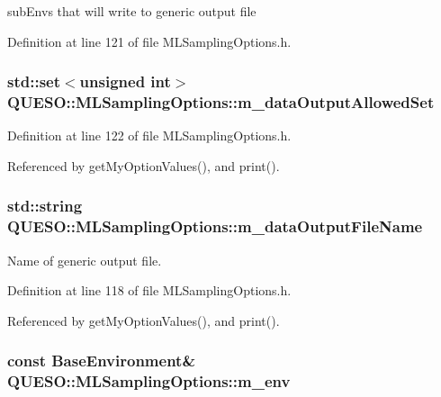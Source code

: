 sub\-Envs that will write to generic output file 



Definition at line 121 of file M\-L\-Sampling\-Options.\-h.

\hypertarget{class_q_u_e_s_o_1_1_m_l_sampling_options_aa5f7e589376e3700b0132c1fa91cccc9}{
\subsubsection[{m\-\_\-data\-Output\-Allowed\-Set}]{\setlength{\rightskip}{0pt plus 5cm}std\-::set$<$unsigned int$>$ Q\-U\-E\-S\-O\-::\-M\-L\-Sampling\-Options\-::m\-\_\-data\-Output\-Allowed\-Set}}\label{class_q_u_e_s_o_1_1_m_l_sampling_options_aa5f7e589376e3700b0132c1fa91cccc9}


Definition at line 122 of file M\-L\-Sampling\-Options.\-h.



Referenced by get\-My\-Option\-Values(), and print().

\hypertarget{class_q_u_e_s_o_1_1_m_l_sampling_options_a2507c0e8b86f9d6f07a3f5609593fc96}{
\subsubsection[{m\-\_\-data\-Output\-File\-Name}]{\setlength{\rightskip}{0pt plus 5cm}std\-::string Q\-U\-E\-S\-O\-::\-M\-L\-Sampling\-Options\-::m\-\_\-data\-Output\-File\-Name}}\label{class_q_u_e_s_o_1_1_m_l_sampling_options_a2507c0e8b86f9d6f07a3f5609593fc96}


Name of generic output file. 



Definition at line 118 of file M\-L\-Sampling\-Options.\-h.



Referenced by get\-My\-Option\-Values(), and print().

\hypertarget{class_q_u_e_s_o_1_1_m_l_sampling_options_a28d73f222e9b20f1c749ed808f69eebd}{
\subsubsection[{m\-\_\-env}]{\setlength{\rightskip}{0pt plus 5cm}const {\bf Base\-Environment}\& Q\-U\-E\-S\-O\-::\-M\-L\-Sampling\-Options\-::m\-\_\-env\hspace{0.3cm}{\ttfamily [private]}}}\label{class_q_u_e_s_o_1_1_m_l_sampling_options_a28d73f222e9b20f1c749ed808f69eebd}


